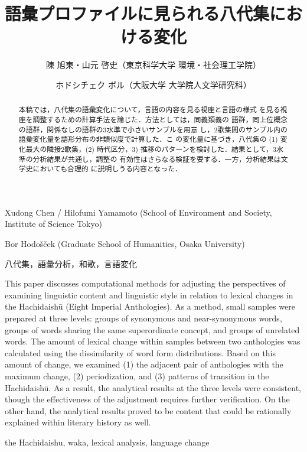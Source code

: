\documentclass[submit]{ipsj}
\date{}
\title{}
\begin{document}
\title{語彙プロファイルに見られる八代集における変化}


\author{陳 旭東・山元 啓史（東京科学大学 環境・社会理工学院）}{Xudong Chen / Hilofumi Yamamoto (School of Environment and Society, Institute of Science Tokyo)}{}
\author{ホドシチェク ボル（大阪大学 大学院人文学研究科）}{Bor Hodo\v{s}\v{c}ek (Graduate School of Humanities, Osaka University)}{}

\begin{abstract}
  本稿では，八代集の語彙変化について，言語の内容を見る視座と言語の様式
  を見る視座を調整するための計算手法を論じた．方法としては，同義類義の
  語群，同上位概念の語群，関係なしの語群の3水準で小さいサンプルを用意
  し，2歌集間のサンプル内の語彙変化量を語形分布の非類似度で計算した．こ
  の変化量に基づき，八代集の (1) 変化最大の隣接2歌集，(2) 時代区分，3)
  推移のパターンを検討した．結果として，3水準の分析結果が共通し，調整の
  有効性はさらなる検証を要する．一方，分析結果は文学史においても合理的
  に説明しうる内容となった．
\end{abstract}

\begin{jkeyword}
  八代集，語彙分析，和歌，言語変化
\end{jkeyword}

\begin{eabstract}
  This paper discusses computational methods for adjusting the
  perspectives of examining linguistic content and linguistic style in
  relation to lexical changes in the Hachidaishū (Eight Imperial
  Anthologies). As a method, small samples were prepared at three
  levels: groups of synonymous and near-synonymous words, groups of
  words sharing the same superordinate concept, and groups of
  unrelated words. The amount of lexical change within samples between
  two anthologies was calculated using the dissimilarity of word form
  distributions. Based on this amount of change, we examined (1) the
  adjacent pair of anthologies with the maximum change, (2)
  periodization, and (3) patterns of transition in the Hachidaishū. As
  a result, the analytical results at the three levels were
  consistent, though the effectiveness of the adjustment requires
  further verification. On the other hand, the analytical results
  proved to be content that could be rationally explained within
  literary history as well.
\end{eabstract}

\begin{ekeyword}
the Hachidaishu, waka, lexical analysis, language change
\end{ekeyword}
\end{document}
